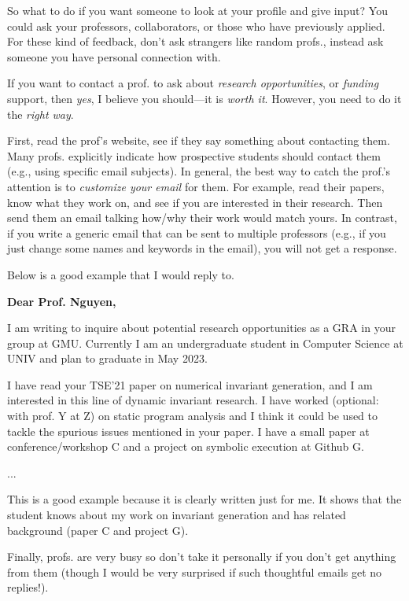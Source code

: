 \documentclass[11pt]{article}
\newenvironment{commentbox}[1][]{
\small
    \begin{cbox}
    \textbf{#1} 
 }{
   \end{cbox}
}
\begin{document}
So what to do if you want someone to look at your profile and give input? You could ask your professors, collaborators, or those who have previously applied. For these kind of feedback,  don't ask strangers like random profs., instead ask someone you have personal connection with.  

If you want to contact a prof. to ask about \emph{research opportunities}, or \emph{funding} support, then \emph{yes}, I believe you should---it is \emph{worth it}. However, you need to do it the \emph{right way}.

First, read the prof's website, see if they say something about contacting them. Many profs. explicitly indicate how prospective students should contact them (e.g., using specific email subjects). 
In general, the best way to catch the prof.'s attention is to \emph{customize your email} for them.  For example, read their papers, know what they work on, and see if you are interested in their research. Then send them an email talking how/why their work would match yours.
In contrast, if you write a generic email that can be sent to multiple professors (e.g., if you just change some names and keywords in the email), you will not get a response. 

Below is a good example that I would reply to.   

\begin{commentbox}[Dear Prof. Nguyen,]

I am writing to inquire about potential research opportunities as a GRA in your group at GMU. Currently I am an undergraduate student in Computer Science at UNIV and plan to graduate in May 2023.

 
I have read your TSE'21 paper on numerical invariant generation, and I am interested in this line of dynamic invariant research. I have worked (optional: with prof. Y at Z) on static program analysis and I think it could be used to tackle the spurious issues mentioned in your paper. I have a small paper at conference/workshop C and a project on symbolic execution at Github G.

...

This is a good example because it is clearly written just for me.  It shows that the student knows about my work on invariant generation and has related  background (paper C and project G). 
\end{commentbox}

Finally, profs. are very busy so don't take it personally if you don't get anything from them (though I would be very surprised if such thoughtful emails get no replies!). 
\end{document}
